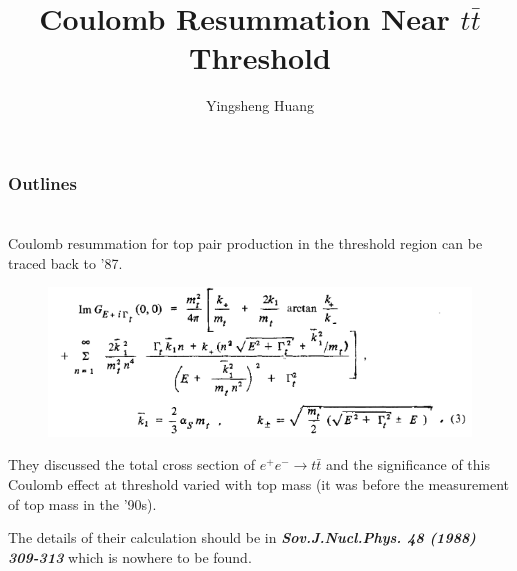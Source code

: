 \documentclass[8pt,dvipsnames,table]{beamer}
\title{Coulomb Resummation Near $t\bar t$ Threshold}
\author[Y. Huang]{Yingsheng Huang}
\institute[IHEP]{Institute of High Energy Physics}
\date
\begin{document}
\begin{frame}{}
	\maketitle
\end{frame}

\begin{frame}
	\frametitle{Outlines}
	\tableofcontents
\end{frame}

\section{\citet{Fadin1987}}
\begin{frame}
	\frametitle{\citet{Fadin1987}}

	Coulomb resummation for top pair production in the threshold region can be traced back to '87\citep{Fadin1987}.
	\begin{figure}[!htb]
		\centering
		\includegraphics[width=\linewidth]{image1.png}
		\label{fig:image1}
	\end{figure}
	They discussed the total cross section of $e^+e^-\to t\bar t$ and the significance of this Coulomb effect at threshold varied with top mass (it was before the measurement of top mass in the '90s).

	\pause
	The details of their calculation should be in \textbf{\textit{Sov.J.Nucl.Phys. 48 (1988) 309-313}} which is nowhere to be found.


\end{frame}
\end{document}
